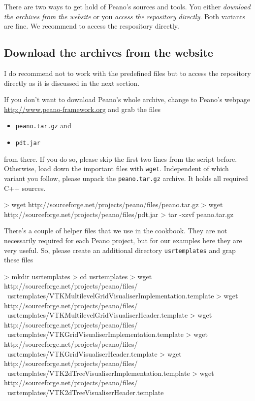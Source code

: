 There are two ways to get hold of Peano's sources and tools. You either {\em
download the archives from the website} or you {\em access the repository
directly}.
Both variants are fine.
We recommend to access the respository directly.


\subsection{Download the archives from the website}

\begin{remark}
  I do recommend not to work with the predefined files but to access the
  repository directly as it is discussed in the next section.
\end{remark}


If you don't want to download Peano's whole archive, change to Peano's webpage
\url{http://www.peano-framework.org} and grab the files
\begin{itemize}
  \item \texttt{peano.tar.gz} and
  \item \texttt{pdt.jar}
\end{itemize}
from there. If you do so, please skip the first two lines from the script
before. Otherwise, load down the important files with \texttt{wget}. 
Independent of which variant you follow, please unpack the \texttt{peano.tar.gz}
archive. 
It holds all required C++ sources.

\begin{code}
> wget http://sourceforge.net/projects/peano/files/peano.tar.gz
> wget http://sourceforge.net/projects/peano/files/pdt.jar
> tar -xzvf peano.tar.gz
\end{code}


\noindent
There's a couple of helper files that we use in the
cookbook. 
They are not necessarily required for each Peano project, but for our examples
here they are very useful.
So, please create an additional directory \texttt{usrtemplates} and grap
these files

\begin{code}
> mkdir usrtemplates
> cd usrtemplates
> wget http://sourceforge.net/projects/peano/files/ \
  usrtemplates/VTKMultilevelGridVisualiserImplementation.template 
> wget http://sourceforge.net/projects/peano/files/ \
  usrtemplates/VTKMultilevelGridVisualiserHeader.template 
> wget http://sourceforge.net/projects/peano/files/ \
  usrtemplates/VTKGridVisualiserImplementation.template 
> wget http://sourceforge.net/projects/peano/files/ \
  usrtemplates/VTKGridVisualiserHeader.template 
> wget http://sourceforge.net/projects/peano/files/ \
  usrtemplates/VTK2dTreeVisualiserImplementation.template 
> wget http://sourceforge.net/projects/peano/files/ \
  usrtemplates/VTK2dTreeVisualiserHeader.template 
\end{code}


